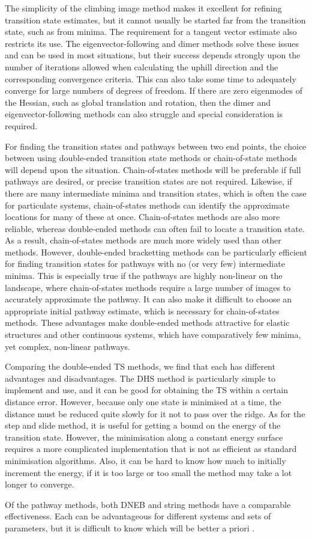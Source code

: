 The simplicity of the climbing image method makes it excellent for refining transition state estimates, but it cannot usually be started far from the transition state, such as from minima.
The requirement for a tangent vector estimate also restricts its use.
The eigenvector-following and dimer methods solve these issues and can be used in most situations, but their success depends strongly upon the number of iterations allowed when calculating the uphill direction and the corresponding convergence criteria.
This can also take some time to adequately converge for large numbers of degrees of freedom.
If there are zero eigenmodes of the Hessian, such as global translation and rotation, then the dimer and eigenvector-following methods can also struggle and special consideration is required.

For finding the transition states and pathways between two end points, the choice between using double-ended transition state methods or chain-of-state methods will depend upon the situation.
Chain-of-states methods will be preferable if full pathways are desired, or precise transition states are not required.
Likewise, if there are many intermediate minima and transition states, which is often the case for particulate systems, chain-of-states methods can identify the approximate locations for many of these at once.
Chain-of-states methods are also more reliable, whereas double-ended methods can often fail to locate a transition state.
As a result, chain-of-states methods are much more widely used than other methods.
However, double-ended bracketting methods can be particularly efficient for finding transition states for pathways with no (or very few) intermediate minima.
This is especially true if the pathways are highly non-linear on the landscape, where chain-of-states methods require a large number of images to accurately approximate the pathway.
It can also make it difficult to choose an appropriate initial pathway estimate, which is necessary for chain-of-states methods.
These advantages make double-ended methods attractive for elastic structures and other continuous systems, which have comparatively few minima, yet complex, non-linear pathways.

Comparing the double-ended TS methods, we find that each has different advantages and disadvantages.
The DHS method is particularly simple to implement and use, and it can be good for obtaining the TS within a certain distance error.
However, because only one state is minimised at a time, the distance must be reduced quite slowly for it not to pass over the ridge.
As for the step and slide method, it is useful for getting a bound on the energy of the transition state.
However, the minimisation along a constant energy surface requires a more complicated implementation that is not as efficient as standard minimisation algorithms.
Also, it can be hard to know how much to initially increment the energy, if it is too large or too small the method may take a lot longer to converge.

Of the pathway methods, both DNEB and string methods have a comparable effectiveness.
Each can be advantageous for different systems and sets of parameters, but it is difficult to know which will be better a priori \cite{Koslover2007}.
